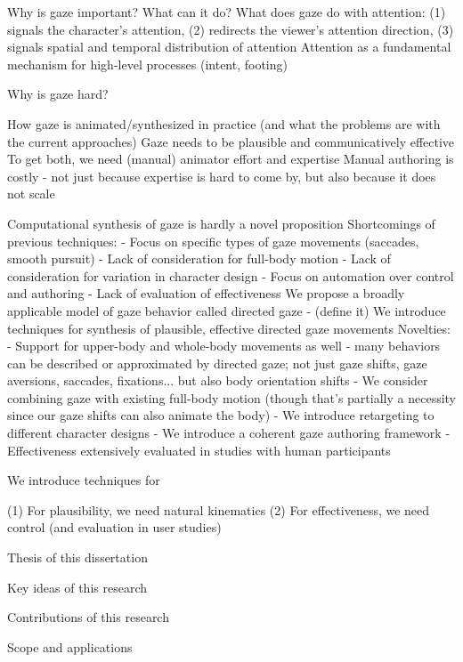 Why is gaze important? What can it do?
What does gaze do with attention: (1) signals the character's attention, (2) redirects the viewer's attention direction, (3) signals spatial and temporal distribution of attention
Attention as a fundamental mechanism for high-level processes (intent, footing)

Why is gaze hard?

How gaze is animated/synthesized in practice (and what the problems are with the current approaches)
Gaze needs to be plausible and communicatively effective
To get both, we need (manual) animator effort and expertise
Manual authoring  is costly - not just because expertise is hard to come by, but also because it does not scale

Computational synthesis of gaze is hardly a novel proposition
Shortcomings of previous techniques:
- Focus on specific types of gaze movements (saccades, smooth pursuit)
- Lack of consideration for full-body motion
- Lack of consideration for variation in character design
- Focus on automation over control and authoring
- Lack of evaluation of effectiveness
We propose a broadly applicable model of gaze behavior called directed gaze - (define it)
We introduce techniques for synthesis of plausible, effective directed gaze movements
Novelties:
- Support for upper-body and whole-body movements as well - many behaviors can be described or approximated by directed gaze; not just gaze shifts, gaze aversions, saccades, fixations... but also body orientation shifts
- We consider combining gaze with existing full-body motion (though that's partially a necessity since our gaze shifts can also animate the body)
- We introduce retargeting to different character designs
- We introduce a coherent gaze authoring framework
- Effectiveness extensively evaluated in studies with human participants

We introduce techniques for 

(1) For plausibility, we need natural kinematics
(2) For effectiveness, we need control (and evaluation in user studies)


Thesis of this dissertation

Key ideas of this research

Contributions of this research

Scope and applications
